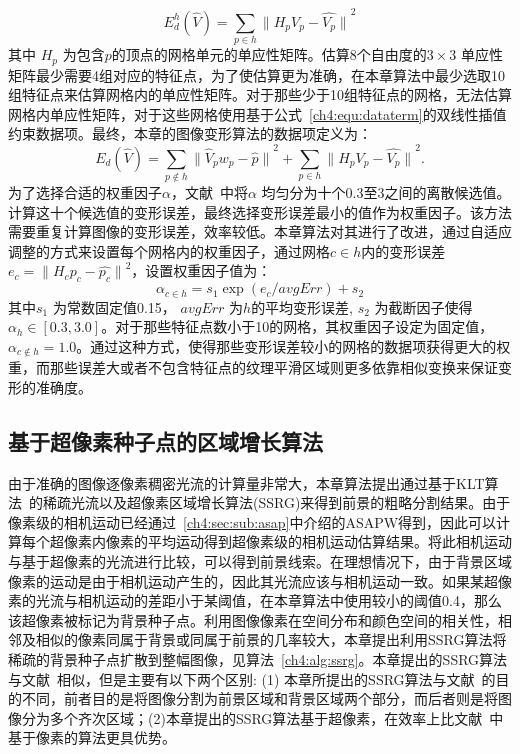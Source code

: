  $$E^{h}_{d}(\hat{V}) = \sum_{p\in h}{\parallel H_{p}V_{p} - \hat{V_{p}}\parallel}^2$$
其中 $H_{p}$ 为包含$p$的顶点的网格单元的单应性矩阵。估算8个自由度的$3\times3$ 单应性矩阵最少需要4组对应的特征点，为了使估算更为准确，在本章算法中最少选取10组特征点来估算网格内的单应性矩阵。对于那些少于10组特征点的网格，无法估算网格内单应性矩阵，对于这些网格使用基于公式~\ref{ch4:equ:dataterm}的双线性插值约束数据项。最终，本章的图像变形算法的数据项定义为：
$${E}_{d}(\hat{V}) = \sum_{p \notin h}{\parallel\hat{V}_{p}{w}_{p}- \hat{p}\parallel}^{2} +
\sum_{p\in h}{\parallel {H_{p}V_{p} - \hat{V_{p}}}\parallel}^2.$$
为了选择合适的权重因子$\alpha$，文献~中将$\alpha$ 均匀分为十个0.3至3之间的离散候选值。计算这十个候选值的变形误差，最终选择变形误差最小的值作为权重因子。该方法需要重复计算图像的变形误差，效率较低。本章算法对其进行了改进，通过自适应调整的方式来设置每个网格内的权重因子，通过网格$c \in h$内的变形误差$e_{c} = {\parallel H_{c}p_{c} - \hat{p_{c}} \parallel}^2 $，设置权重因子值为：
 $$ \alpha_{c\in h} = s_{1}\exp({e_{c}/avgErr})+ s_{2} $$
 其中$s_{1}$ 为常数固定值0.15， $avgErr$ 为$h$的平均变形误差, $s_{2}$ 为截断因子使得 $\alpha_{h} \in [0.3,3.0]$。对于那些特征点数小于10的网格，其权重因子设定为固定值， $\alpha_{c \notin h} = 1.0$。通过这种方式，使得那些变形误差较小的网格的数据项获得更大的权重，而那些误差大或者不包含特征点的纹理平滑区域则更多依靠相似变换来保证变形的准确度。
\subsection{基于超像素种子点的区域增长算法}
\label{ch4:sec:sub:ssrg}
由于准确的图像逐像素稠密光流的计算量非常大，本章算法提出通过基于KLT算法~\cite{KLT}的稀疏光流以及超像素区域增长算法(SSRG)来得到前景的粗略分割结果。由于像素级的相机运动已经通过~\ref{ch4:sec:sub:asap}中介绍的ASAPW得到，因此可以计算每个超像素内像素的平均运动得到超像素级的相机运动估算结果。将此相机运动与基于超像素的光流进行比较，可以得到前景线索。在理想情况下，由于背景区域像素的运动是由于相机运动产生的，因此其光流应该与相机运动一致。如果某超像素的光流与相机运动的差距小于某阈值，在本章算法中使用较小的阈值0.4，那么该超像素被标记为背景种子点。利用图像像素在空间分布和颜色空间的相关性，相邻及相似的像素同属于背景或同属于前景的几率较大，本章提出利用SSRG算法将稀疏的背景种子点扩散到整幅图像，见算法~\ref{ch4:alg:ssrg}。本章提出的SSRG算法与文献~相似，但是主要有以下两个区别: (1) 本章所提出的SSRG算法与文献~的目的不同，前者目的是将图像分割为前景区域和背景区域两个部分，而后者则是将图像分为多个齐次区域；(2)本章提出的SSRG算法基于超像素，在效率上比文献~中基于像素的算法更具优势。


